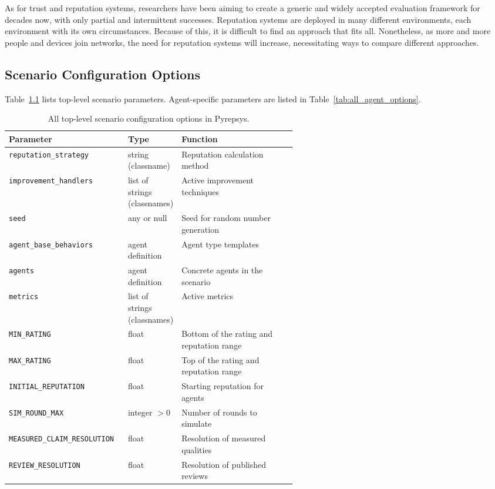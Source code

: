\documentclass[%
    ]{\PathToTumTemplate/thesis/tum_thesis}
\begin{document}
As for trust and reputation systems, researchers have been aiming to create a generic and widely accepted evaluation framework for decades now, with only partial and intermittent successes.
Reputation systems are deployed in many different environments, each environment with its own circumstances.
Because of this, it is difficult to find an approach that fits all.
Nonetheless, as more and more people and devices join networks, the need for reputation systems will increase, necessitating ways to compare different approaches.




\begin{appendix}

\chapter{Scenario Configuration Options}\label{appendix:scenarios}

Table~\ref{tab:all_scenario_options} lists top-level scenario parameters.
Agent-specific parameters are listed in Table~\ref{tab:all_agent_options}.

\begin{table}[p]
\centering
\begin{tabular}{@{}lp{0.175\linewidth}p{0.4\linewidth}@{}}
\toprule
\textbf{Parameter} & \textbf{Type} & \textbf{Function}    \\ \midrule
\texttt{reputation\_strategy} & string \mbox{(classname)} & Reputation calculation method \\
\texttt{improvement\_handlers} & list of strings \mbox{(classnames)} & Active improvement techniques \\
\texttt{seed} & any or null & Seed for random number generation \\
\texttt{agent\_base\_behaviors} & agent definition & Agent type templates \\
\texttt{agents} & agent definition & Concrete agents in the scenario \\
\texttt{metrics} & list of strings \mbox{(classnames)} & Active metrics \\
\texttt{MIN\_RATING} & float & Bottom of the rating and reputation range \\
\texttt{MAX\_RATING} & float & Top of the rating and reputation range \\
\texttt{INITIAL\_REPUTATION} & float & Starting reputation for agents \\
\texttt{SIM\_ROUND\_MAX} & integer $>0$ & Number of rounds to simulate \\
\texttt{MEASURED\_CLAIM\_RESOLUTION} & float & Resolution of measured qualities \\
\texttt{REVIEW\_RESOLUTION} & float & Resolution of published reviews \\
\bottomrule
\end{tabular}
\caption{
	All top-level scenario configuration options in Pyrepsys.
}
\label{tab:all_scenario_options}
\end{table}


\end{appendix}
\end{document}
